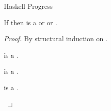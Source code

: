 \newcommand{\pshyp}[2]{#1 is a \profv or #1 \red #2 or #1 \red \emph{\experr{\varstr}}\xspace}
\newcommand{\pshypref}[2]{\pshyp{#1}{#2} by the induction hypothesis.\xspace}
\newcommand{\psval}[3]{If #1 is a \profv then \judeh{}{#1}{#2} by lemmas \ref{leminv} and \ref{lemuni} and #1 $=$ #3 by lemma \ref{lemcan}.\xspace}
\newcommand{\pssub}[4]{If #1 \red #2 then #3 \red #4.\xspace}
\newcommand{\psred}[2]{\redrule{#1}{#2}.\xspace}
\newcommand{\pserr}[2]{If #1 \red \emph{\experr{\varstr}} then #2 \red \emph{\experr{\varstr}}.\xspace}

\begin{theorem}{Haskell Progress}

\label{thmhps}

If \judeh{}{\varexph}{\vartyh} then \pshyp{\first{\varexph}}{\second{\varexph}}.

\begin{proof}

By structural induction on \varexph.



\newcommand{\psfabss}{\expfabss{\varvarh}{\vartyh}{\varexph}\xspace}

\begin{case}

\psfabss

\psfabss is a \profv.

\end{case}


\newcommand{\pstabs}{\exptabs{\tyvarh}{\varexph}\xspace}

\begin{case}

\pstabs

\pstabs is a \profv.

\end{case}


\newcommand{\psnum}{\expnum{\symnum}\xspace}

\begin{case}

\psnum

\psnum is a \profv.

\end{case}


\newcommand{\psnils}{\expnils{\vartyh}\xspace}


\end{proof}
\end{theorem}
